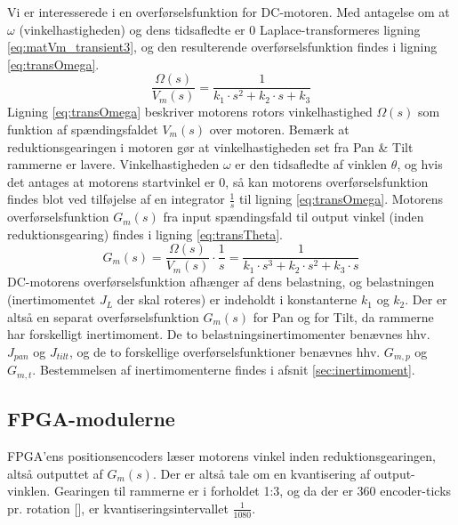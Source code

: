 Vi er interesserede i en overførselsfunktion for DC-motoren. Med antagelse om at \(\omega\) (vinkelhastigheden) og dens tidsafledte er 0
Laplace-transformeres ligning \ref{eq:matVm_transient3}, og den resulterende overførselsfunktion findes
i ligning \ref{eq:transOmega}.
\begin{equation}
	\frac{\Omega\left(s\right)}{V_m\left(s\right)}=\frac{1}{k_1\cdot{}s^2+k_2\cdot{}s+k_3}
	\label{eq:transOmega}
 \end{equation}
Ligning \ref{eq:transOmega} beskriver motorens rotors vinkelhastighed \(\Omega\left(s\right)\) som funktion af spændingsfaldet
\(V_m\left(s\right)\) over motoren. Bemærk at reduktionsgearingen i motoren gør at vinkelhastigheden set fra Pan \& Tilt rammerne
er lavere.
Vinkelhastigheden \(\omega\) er den tidsafledte af vinklen \(\theta\),
og hvis det antages at motorens startvinkel er 0, så kan motorens overførselsfunktion
findes blot ved tilføjelse af en integrator \(\frac{1}{s}\) til ligning \ref{eq:transOmega}.
Motorens overførselsfunktion \(G_m\left(s\right)\) fra input spændingsfald til output vinkel (inden reduktionsgearing) findes
i ligning \ref{eq:transTheta}.
\begin{equation}
	G_m\left(s\right)=\frac{\Omega\left(s\right)}{V_m\left(s\right)}\cdot{}\frac{1}{s}=\frac{1}{k_1\cdot{}s^3+k_2\cdot{}s^2+k_3\cdot{}s}
	\label{eq:transTheta}
\end{equation}
DC-motorens overførselsfunktion afhænger af dens belastning,
og belastningen (inertimomentet \(J_L\) der skal roteres) er indeholdt i konstanterne \(k_1\) og \(k_2\).
Der er altså en separat overførselsfunktion \(G_m\left(s\right)\) for Pan og for Tilt,
da rammerne har forskelligt inertimoment.
De to belastningsinertimomenter benævnes hhv. \(J_{pan}\) og \(J_{tilt}\),
og de to forskellige overførselsfunktioner benævnes hhv. \(G_{m,p}\) og \(G_{m,t}\).
Bestemmelsen af inertimomenterne findes i afsnit \ref{sec:inertimoment}.

\subsection{FPGA-modulerne}
\label{subsec:matFPGA}
FPGA'ens positionsencoders læser motorens vinkel inden reduktionsgearingen,
altså outputtet af \(G_m\left(s\right)\).
Der er altså tale om en kvantisering af output-vinklen.
Gearingen til rammerne er i forholdet 1:3, og da der er 360 encoder-ticks pr. rotation [\cite{emgmotor}],
er kvantiseringsintervallet \(\frac{1}{1080}\).

